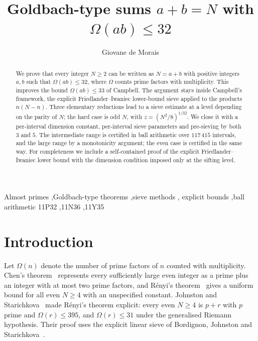 \documentclass[preprint,11pt]{elsarticle}
\theoremstyle{definition}
\theoremstyle{remark}
\numberwithin{equation}{section}
\begin{document}
\begin{frontmatter}

\title{Goldbach-type sums \texorpdfstring{$a+b=N$}{a+b=N} with \texorpdfstring{$\Omega(ab)\le 32$}{Omega(ab) <= 32}}

\author{Giovane de Morais}

\begin{abstract}
We prove that every integer $N\ge 2$ can be written as $N=a+b$ with
positive integers $a,b$ such that $\Omega(ab)\le 32$, where $\Omega$
counts prime factors with multiplicity. This improves the bound
$\Omega(ab)\le33$ of Campbell. The argument stays inside Campbell's
framework, the explicit Friedlander--Iwaniec lower-bound sieve applied to
the products $n(N-n)$. Three elementary reductions lead to a sieve
estimate at a level depending on the parity of $N$; the hard case is odd
$N$, with $z=(N^2/8)^{1/32}$. We close it with a per-interval dimension constant, per-interval sieve parameters
and pre-sieving by both $3$ and $5$. The intermediate range is certified in ball arithmetic over
$117\,415$ intervals, and the large range by a monotonicity argument; the
even case is certified in the same way. For completeness we include a
self-contained proof of the explicit Friedlander--Iwaniec lower bound with
the dimension condition imposed only at the sifting level.
\end{abstract}

\begin{keyword}
Almost primes \sep Goldbach-type theorems \sep sieve methods \sep
explicit bounds \sep ball arithmetic
\MSC[2020] 11P32 \sep 11N36 \sep 11Y35
\end{keyword}

\end{frontmatter}

\section{Introduction}\label{sec:intro}

Let $\Omega(n)$ denote the number of prime factors of $n$ counted with
multiplicity. Chen's theorem~\cite{Chen1973} represents every sufficiently
large even integer as a prime plus an integer with at most two prime
factors, and R\'enyi's theorem~\cite{Renyi1948} gives a uniform bound for
all even $N\ge4$ with an unspecified constant. Johnston and
Starichkova~\cite{JS2025} made R\'enyi's theorem explicit: every even
$N\ge 4$ is $p+r$ with $p$ prime and $\Omega(r)\le 395$, and
$\Omega(r)\le 31$ under the generalised Riemann hypothesis. Their proof
uses the explicit linear sieve of Bordignon, Johnston and
Starichkova~\cite{BJS2025}.
\end{document}
